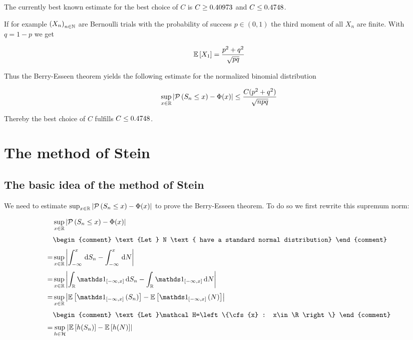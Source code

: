 \begin{remark}
  The currently best known estimate for the best choice of $C$ is $C \ge 0.40973$\cite{esseen1956} and $C \le 0.4748$\cite{shevtsova2011}.
\end{remark}

\begin{remark}
  If for example $\left({X_n}\right)_{{n}\in\mathbb N}$ are Bernoulli trials with the probability of success $p \in (0,1)$ the third moment of all $X_n$ are finite. With $q=1-p$ we get

\begin{align}
  \mathbb E\left[{X_1}\right]=\frac{p^2+q^2}{\sqrt{pq}}
\end{align}

Thus the Berry-Esseen theorem yields the following estimate for the normalized binomial distribution

\begin{align}
  \sup_{x\in\mathbb R} \left|{\mathcal P\left({S_n\le x}\right)-\Phi(x)}\right| \le \frac{C(p^2+q^2)}{\sqrt{npq}}
\end{align}

\noindent Thereby the best choice of $C$ fulfills $C \le 0.4748$.
\end{remark}

\section{The method of Stein}

\subsection{The basic idea of the method of Stein}

We need to estimate $\sup_{x\in\mathbb R} \left|{\mathcal P\left({S_n\le x}\right)-\Phi(x)}\right|$ to prove the Berry-Esseen theorem. To do so we first rewrite this supremum norm:

\begin{align}
   & \sup_{x\in\R} \abs{\P{S_n\le x}-\Phi(x)} \nl
   &
   \begin{comment}
     \text{Let } N \text{ have a standard normal distribution}
   \end{comment} \nl
  =& \sup_{x\in\R} \abs{\int_{-\infty}^x \d{S_n} - \int_{-\infty}^x \d{N}} \nl
  =& \sup_{x\in\R} \abs{\int_{\R} \cfs{x} \d{S_n} - \int_{\R} \cfs{x} \d{N}} \nl
  =& \sup_{x\in\R} \abs{\E{\cf{x}{S_n}} - \E{\cf{x}{N}}} \nl
   &
   \begin{comment}
     \text{Let }\mathcal H=\left\{\cfs{x} : x\in\R\right\}
   \end{comment} \nl
  =& \sup_{h\in\mathcal H} \abs{\E{h(S_n)}-\E{h(N)}}
\end{align}

